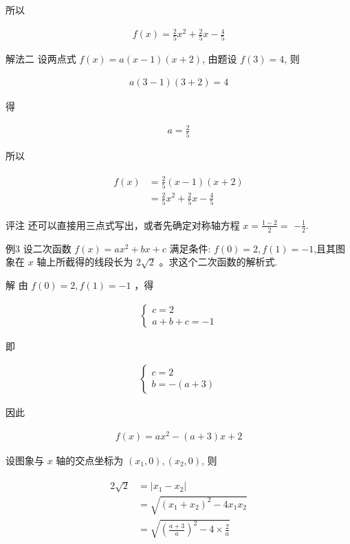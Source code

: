 \documentclass[10pt]{article}
\begin{document}
所以

\begin{align*}
f(x)=\frac{2}{5} x^{2}+\frac{2}{5} x-\frac{4}{5}
\end{align*}

解法二 设两点式 $f(x)=a(x-1)(x+2)$, 由题设 $f(3)=4$, 则

\begin{align*}
a(3-1)(3+2)=4
\end{align*}

得

\begin{align*}
a=\frac{2}{5}
\end{align*}

所以

\begin{align*}
\begin{aligned}
f(x) & =\frac{2}{5}(x-1)(x+2) \\
& =\frac{2}{5} x^{2}+\frac{2}{5} x-\frac{4}{5}
\end{aligned}
\end{align*}

评注 还可以直接用三点式写出，或者先确定对称轴方程 $x=\frac{1-2}{2}=$ $-\frac{1}{2}$.

例3 设二次函数 $f(x)=a x^{2}+b x+c$ 满足条件: $f(0)=2, f(1)=-1$,且其图象在 $x$ 轴上所截得的线段长为 $2 \sqrt{2}$ 。求这个二次函数的解析式.

解 由 $f(0)=2, f(1)=-1$ ，得

\begin{align*}
\left\{\begin{array}{l}
c=2 \\
a+b+c=-1
\end{array}\right.
\end{align*}

即

\begin{align*}
\left\{\begin{array}{l}
c=2 \\
b=-(a+3)
\end{array}\right.
\end{align*}

因此

\begin{align*}
f(x)=a x^{2}-(a+3) x+2
\end{align*}

设图象与 $x$ 轴的交点坐标为 $\left(x_{1}, 0\right),\left(x_{2}, 0\right)$, 则

\begin{align*}
\begin{aligned}
2 \sqrt{2} & =\left|x_{1}-x_{2}\right| \\
& =\sqrt{\left(x_{1}+x_{2}\right)^{2}-4 x_{1} x_{2}} \\
& =\sqrt{\left(\frac{a+3}{a}\right)^{2}-4 \times \frac{2}{a}}
\end{aligned}
\end{align*}
\end{document}

